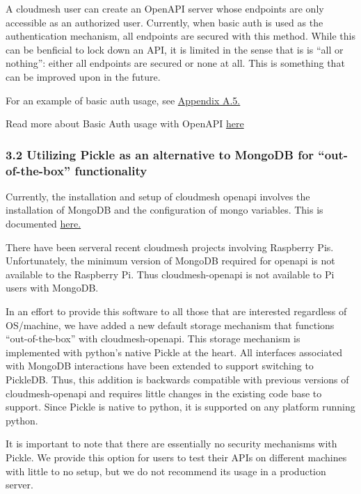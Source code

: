A cloudmesh user can create an OpenAPI server whose endpoints are only
accessible as an authorized user. Currently, when basic auth is used as
the authentication mechanism, all endpoints are secured with this
method. While this can be benficial to lock down an API, it is limited
in the sense that is is ``all or nothing'': either all endpoints are
secured or none at all. This is something that can be improved upon in
the future.

For an example of basic auth usage, see
\protect\hyperlink{a5-basic-auth-example}{Appendix A.5.}

Read more about Basic Auth usage with OpenAPI
\href{https://swagger.io/docs/specification/authentication/basic-authentication/}{here}

\hypertarget{utilizing-pickle-as-an-alternative-to-mongodb-for-out-of-the-box-functionality}{%
\subsubsection{3.2 Utilizing Pickle as an alternative to MongoDB for
``out-of-the-box''
functionality}\label{utilizing-pickle-as-an-alternative-to-mongodb-for-out-of-the-box-functionality}}

Currently, the installation and setup of cloudmesh openapi involves the
installation of MongoDB and the configuration of mongo variables. This
is documented
\href{https://github.com/cloudmesh/cloudmesh-openapi\#installation}{here.}

There have been serveral recent cloudmesh projects involving Raspberry
Pis. Unfortunately, the minimum version of MongoDB required for openapi
is not available to the Raspberry Pi. Thus cloudmesh-openapi is not
available to Pi users with MongoDB.

In an effort to provide this software to all those that are interested
regardless of OS/machine, we have added a new default storage mechanism
that functions ``out-of-the-box'' with cloudmesh-openapi. This storage
mechanism is implemented with python's native Pickle at the heart. All
interfaces associated with MongoDB interactions have been extended to
support switching to PickleDB. Thus, this addition is backwards
compatible with previous versions of cloudmesh-openapi and requires
little changes in the existing code base to support. Since Pickle is
native to python, it is supported on any platform running python.

It is important to note that there are essentially no security
mechanisms with Pickle. We provide this option for users to test their
APIs on different machines with little to no setup, but we do not
recommend its usage in a production server.


